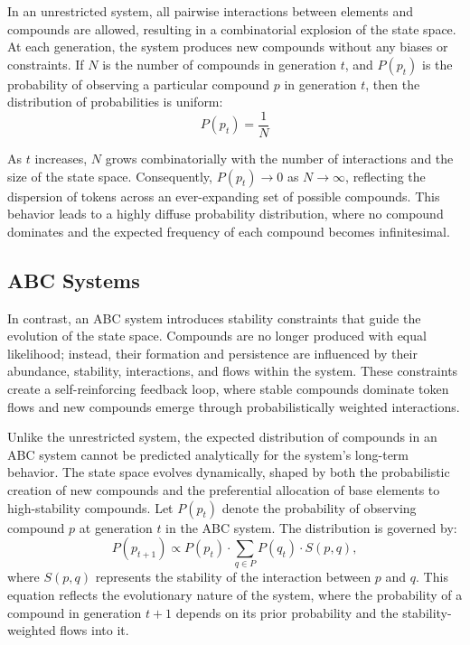 \documentclass[entropy,article,submit,pdftex,oneauthor]{Definitions/mdpi}
\begin{document}
In an unrestricted system, all pairwise interactions between elements and compounds are allowed, resulting in a combinatorial explosion of the state space. At each generation, the system produces new compounds without any biases or constraints. If \( N \) is the number of compounds in generation \( t \), and \( P(p_t) \) is the probability of observing a particular compound \( p \) in generation \( t \), then the distribution of probabilities is uniform:
\begin{equation}
P(p_t) = \frac{1}{N}
\end{equation}

As \( t \) increases, \( N \) grows combinatorially with the number of interactions and the size of the state space. Consequently, \( P(p_t) \to 0 \) as \( N \to \infty \), reflecting the dispersion of tokens across an ever-expanding set of possible compounds. This behavior leads to a highly diffuse probability distribution, where no compound dominates and the expected frequency of each compound becomes infinitesimal.

\subsection{ABC Systems}

In contrast, an ABC system introduces stability constraints that guide the evolution of the state space. Compounds are no longer produced with equal likelihood; instead, their formation and persistence are influenced by their abundance, stability, interactions, and flows within the system. These constraints create a self-reinforcing feedback loop, where stable compounds dominate token flows and new compounds emerge through probabilistically weighted interactions.

Unlike the unrestricted system, the expected distribution of compounds in an ABC system cannot be predicted analytically for the system's long-term behavior. The state space evolves dynamically, shaped by both the probabilistic creation of new compounds and the preferential allocation of base elements to high-stability compounds. Let \( P(p_t) \) denote the probability of observing compound \( p \) at generation \( t \) in the ABC system. The distribution is governed by:
\begin{equation}
P(p_{t+1}) \propto P(p_t) \cdot \sum_{q \in P} P(q_t) \cdot S(p, q),
\end{equation}
where \( S(p, q) \) represents the stability of the interaction between \( p \) and \( q \). This equation reflects the evolutionary nature of the system, where the probability of a compound in generation \( t+1 \) depends on its prior probability and the stability-weighted flows into it. 
\end{document}
